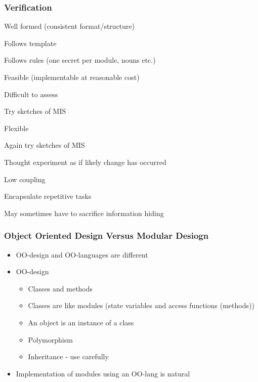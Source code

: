 \documentclass[t,12pt,numbers,fleqn]{beamer}
\begin{document}

\begin{frame}
\frametitle{Verification}

\bi
\item Well formed (consistent format/structure)
\bi
\item Follows template
\item Follows rules (one secret per module, nouns etc.)
\ei
\item Feasible (implementable at reasonable cost)
\bi
\item Difficult to assess
\item Try sketches of MIS
\ei
\item Flexible
\bi
\item Again try sketches of MIS
\item Thought experiment as if likely change has occurred
\item Low coupling
\item Encapsulate repetitive tasks
\ei
\item May sometimes have to sacrifice information hiding
\ei

\end{frame}


\begin{frame}
\frametitle{Object Oriented Design Versus Modular Desiogn}
\begin{itemize}
\item OO-design and OO-languages are different
\item OO-design
\begin{itemize}
\item Classes and methods
\item Classes are like modules (state variables and access functions (methods))
\item An object is an instance of a class
\item Polymorphism
\item Inheritance - use carefully
\end{itemize}
\item Implementation of modules using an OO-lang is natural
\end{itemize}
\end{frame}

\end{document}
